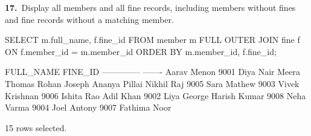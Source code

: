 \noindent\begin{minipage}{\linewidth}
\begingroup{}
{\fontsize{14}{17}\selectfont\textbf{17.}}\ Display all members and all fine records, including members without fines and fine records without a matching member.\par
\endgroup\vspace{12pt}


\begin{sqlcode}
SELECT m.full_name, f.fine_id
FROM member m
FULL OUTER JOIN fine f ON f.member_id = m.member_id
ORDER BY m.member_id, f.fine_id;
\end{sqlcode}

\vspace{18pt}


\begin{sqlout}[fontsize=\small]
FULL_NAME       FINE_ID
--------------  -------
Aarav Menon        9001
Diya Nair
Meera Thomas
Rohan Joseph
Ananya Pillai
Nikhil Raj         9005
Sara Mathew        9003
Vivek Krishnan     9006
Ishita Rao
Adil Khan          9002
Liya George
Harish Kumar       9008
Neha Varma         9004
Joel Antony        9007
Fathima Noor

15 rows selected.
\end{sqlout}
\end{minipage}\par\vspace{24pt}

